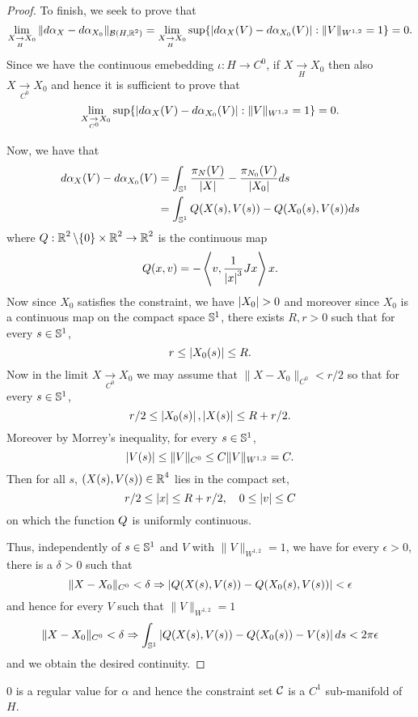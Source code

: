 \documentclass[12pt]{article}
\begin{document}
\begin{proof}
To finish, we seek to prove that
\[
\lim_{X \underset{H}{\to} X_0} \|d\alpha_X - d\alpha_{X_0}\|_{\mathcal{B}(H, \operatorname{\mathbb{R}}^2)} = \lim_{X \underset{H}{\to} X_0} \sup \{\left|{d\alpha_X (V) - d\alpha_{X_0}(V)}\right| : \|V\|_{W^{1,2}} = 1\} = 0.
\]
Since we have the continuous emebedding \(\iota : H \to C^0\), if \(X \underset{H}{\to} X_0\) then also \(X \underset{C^0}{\to} X_0\) and hence it is sufficient to prove that
\[
\lim_{X \underset{C^0}{\to} X_0} \sup \{\left|{d\alpha_X (V) - d\alpha_{X_0}(V)}\right| : \|V\|_{W^{1,2}} = 1\} = 0.
\]

Now, we have that
\[
\begin{split}
d\alpha_X(V) - d\alpha_{X_0} (V) &= \int_{\operatorname{\mathbb{S}^1}} \frac{\pi_N(V)}{\left|{X}\right|} - \frac{\pi_{N_0} (V)}{\left|{X_0}\right|} ds \\
&= \int_{\operatorname{\mathbb{S}^1}} Q(X(s), V(s)) - Q(X_0(s), V(s)) ds
\end{split}
\]
where \(Q : \operatorname{\mathbb{R}}^2\backslash\{0\} \times \operatorname{\mathbb{R}}^2 \to \operatorname{\mathbb{R}}^2\) is the continuous map
\[
Q (x, v) = -\left\langle{v},{\frac{1}{\left|{x}\right|^3}J x}\right\rangle x.
\]
Now since \(X_0\) satisfies the constraint, we have \(\left|{X_0}\right| > 0\) and moreover since \(X_0\) is a continuous map on the compact space \(\operatorname{\mathbb{S}^1}\), there exists \(R, r > 0\) such that for every \(s \in \operatorname{\mathbb{S}^1}\),
\[
r \leq \left|{X_0(s)}\right| \leq R.
\]
Now in the limit \(X \underset{C^0}{\to} X_0\) we may assume that \(\|X - X_0\|_{C^0} < r/2\) so that for every \(s \in \operatorname{\mathbb{S}^1}\),
\[
r/2 \leq \left|{X_0(s)}\right|, \left|{X(s)}\right| \leq R + r/2.
\]
Moreover by Morrey's inequality, for every \(s \in \operatorname{\mathbb{S}^1}\),
\[
\left|{V(s)}\right| \leq \|V\|_{C^0} \leq C \|V\|_{W^{1,2}} = C.
\]
Then for all \(s\), \((X(s), V(s)) \in \operatorname{\mathbb{R}}^4\) lies in the compact set,
\[
r/2 \leq \left|{x}\right| \leq R + r/2, \quad 0 \leq \left|{v}\right| \leq C
\]
on which the function \(Q\) is uniformly continuous.

Thus, independently of \(s \in \operatorname{\mathbb{S}^1}\) and \(V\) with \(\|V\|_{W^{1,2}} = 1\), we have for every \(\epsilon > 0\), there is a \(\delta > 0\) such that
\[
\|X - X_0\|_{C^0} < \delta \Rightarrow \left|{Q(X(s), V(s)) - Q(X_0(s), V(s))}\right| < \epsilon
\]
and hence for every \(V\) such that \(\|V\|_{W^{1,2}} = 1\)
\[
\|X - X_0\|_{C^0} < \delta \Rightarrow \int_{\operatorname{\mathbb{S}^1}} \left|{Q(X(s), V(s)) - Q(X_0(s)) - V(s)}\right| ds < 2\pi \epsilon
\]
and we obtain the desired continuity.
\end{proof}

\begin{lem}
\label{lem:constraintC1}
\(0\) is a regular value for \(\alpha\) and hence the constraint set \(\operatorname{\mathcal{C}}\) is a \(C^1\) sub-manifold of \(H\).
\end{lem}
\end{document}
